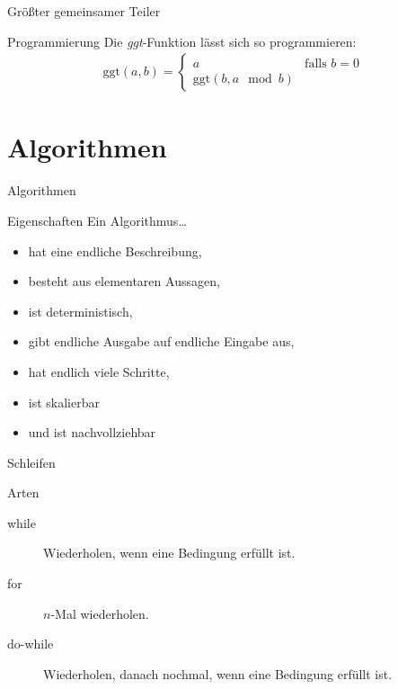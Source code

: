 \begin{frame}{Größter gemeinsamer Teiler}
    \begin{exampleblock}{Programmierung}
        Die \emph{ggt}-Funktion lässt sich so programmieren:
        \begin{align*}
            \mathrm{ggt}\left( a, b\right) = \begin{cases} a &\text{falls } b = 0 \\ \mathrm{ggt}\left( b, a\mod b\right)& \end{cases}
        \end{align*}
    \end{exampleblock}
\end{frame}

\section{Algorithmen}

\begin{frame}{Algorithmen}
    \begin{block}{Eigenschaften}
        Ein Algorithmus\dots
        \begin{itemize}
            \item hat eine endliche Beschreibung, 
                \pause
            \item besteht aus elementaren Aussagen,
                \pause
            \item ist deterministisch,
                \pause
            \item gibt endliche Ausgabe auf endliche Eingabe aus,
                \pause
            \item hat endlich viele Schritte,
                \pause
            \item ist skalierbar
                \pause
            \item und ist nachvollziehbar
        \end{itemize}
    \end{block}
\end{frame}

\begin{frame}{Schleifen}
    \begin{block}{Arten}
        \begin{description}
            \item[while] Wiederholen, wenn eine Bedingung erfüllt ist.
                \pause
            \item[for] $n$-Mal wiederholen.
                \pause
            \item[do-while] Wiederholen, danach nochmal, wenn eine Bedingung erfüllt ist.
        \end{description}
    \end{block}
\end{frame}

